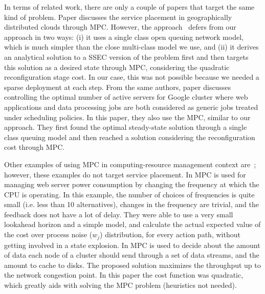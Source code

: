 In terms of related work, there are only a couple of papers that  target the same kind of problem.
Paper \cite{zhang2012dynamicPlacement} discusses the service placement in geographically distributed clouds through MPC. However, the approach~\cite{zhang2012dynamicPlacement} defers from our approach in two ways: (i) it uses a single class open queuing network model, which is much simpler than the close multi-class model we use, and (ii) it derives an analytical solution to a SSEC version of the problem first and then targets this solution as a desired state through MPC, considering the quadratic reconfiguration stage cost. In our case, this was not possible because we needed a sparse deployment at each step. From the same authors, paper \cite{zhang2012dynamicProvisioning} discusses controlling the optimal number of active servers for Google cluster where web applications and data processing jobs are both considered as generic jobs treated under scheduling policies. In this paper, they also use the MPC, similar to our approach. They first found the optimal steady-state solution through a single class queuing model and then reached a solution considering the reconfiguration cost through MPC.

Other examples of using MPC in computing-resource management context are~\cite{baiefficient,abdelwahed2004control, kandasamy2004self, bhat2006enabling,patikirikorala2011hammerstein}; however, these examples do not target service placement.
In \cite{baiefficient,abdelwahed2004control,kandasamy2004self} MPC is used for managing web server power consumption by changing the frequency at which the CPU is operating. 
In this example, the number of choices of frequencies is quite small (i.e. less than 10 alternatives), changes in the frequency are trivial, and the feedback does not have a lot of delay. 
They were able to use a very small lookahead horizon and a simple model, and calculate the actual expected value of the cost over process noise ($w_j$) distribution, for every action path, without getting involved in a state explosion.  
In \cite{bhat2006enabling} MPC is used to decide about the amount of data each node of a cluster should send through a set of data streams, and the amount to cache to disks. The proposed solution maximizes the throughput up to the network congestion point. In this paper the cost function was quadratic, which greatly aids with solving the MPC problem (heuristics not needed).   

